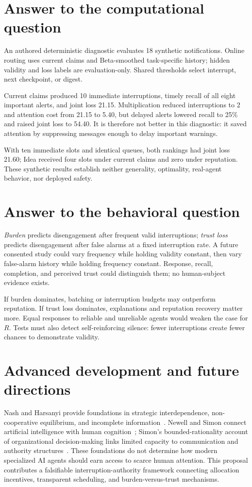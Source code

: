 \section{Answer to the computational question}
An authored deterministic diagnostic evaluates 18 synthetic notifications. Online routing uses current claims and Beta-smoothed task-specific history; hidden validity and loss labels are evaluation-only. Shared thresholds select interrupt, next checkpoint, or digest.

Current claims produced 10 immediate interruptions, timely recall of all eight important alerts, and joint loss 21.15. Multiplication reduced interruptions to 2 and attention cost from 21.15 to 5.40, but delayed alerts lowered recall to 25\% and raised joint loss to 54.40. It is therefore not better in this diagnostic: it saved attention by suppressing messages enough to delay important warnings.

With ten immediate slots and identical queues, both rankings had joint loss 21.60; Idea received four slots under current claims and zero under reputation. These synthetic results establish neither generality, optimality, real-agent behavior, nor deployed safety.

\clearpage\balance
\section{Answer to the behavioral question}
\emph{Burden} predicts disengagement after frequent valid interruptions; \emph{trust loss} predicts disengagement after false alarms at a fixed interruption rate. A future consented study could vary frequency while holding validity constant, then vary false-alarm history while holding frequency constant. Response, recall, completion, and perceived trust could distinguish them; no human-subject evidence exists.

If burden dominates, batching or interruption budgets may outperform reputation. If trust loss dominates, explanations and reputation recovery matter more. Equal responses to reliable and unreliable agents would weaken the case for $R$. Tests must also detect self-reinforcing silence: fewer interruptions create fewer chances to demonstrate validity.

\section{Advanced development and future directions}
Nash and Harsanyi provide foundations in strategic interdependence, non-cooperative equilibrium, and incomplete information~\cite{nash1950,harsanyi1968,nobel1994game}. Newell and Simon connect artificial intelligence with human cognition~\cite{acm1975newellsimon}; Simon's bounded-rationality account of organizational decision-making links limited capacity to communication and authority structures~\cite{simon1978lecture}. These foundations do not determine how modern specialized AI agents should earn access to scarce human attention. This proposal contributes a falsifiable interruption-authority framework connecting allocation incentives, transparent scheduling, and burden-versus-trust mechanisms.

